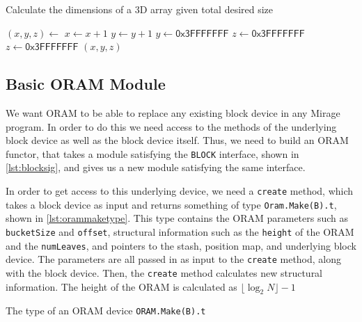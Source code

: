 \documentclass[12pt,a4paper,twoside,openright]{report}
\begin{document}
\begin{algorithm}
\caption{Calculate the dimensions of a 3D array given total desired size}
\label{alg:posmapdims}
\begin{algorithmic}[1]
\vskip 10pt
\vskip 10pt
\vskip 10pt
	\State $(x, y, z) \gets$ 
\vskip 10pt
	\State $x \gets x + 1$
	\State $y \gets y + 1$
\vskip 10pt
		\State $y \gets \mathsf{0x3FFFFFFF}$
		\State $z \gets \mathsf{0x3FFFFFFF}$
		\State $z \gets \mathsf{0x3FFFFFFF}$
	\EndIf
\vskip 10pt
	\State \Return $(x,y,z)$
\vskip 10pt
\EndFunction
\vskip 10pt
\end{algorithmic}
\end{algorithm}

\subsection{Basic ORAM Module}

We want ORAM to be able to replace any existing block device in any Mirage program. In order to do this we need access to the methods of the underlying block device as well as the block device itself. Thus, we need to build an ORAM functor, that takes a module satisfying the \texttt{BLOCK} interface, shown in \cref{lst:blocksig}, and gives us a new module satisfying the same interface.

In order to get access to this underlying device, we need a \texttt{create} method, which takes a block device as input and returns something of type \texttt{Oram.Make(B).t}, shown in \cref{lst:orammaketype}. This type contains the ORAM parameters such as \texttt{bucketSize} and \texttt{offset}, structural information such as the \texttt{height} of the ORAM and the \texttt{numLeaves}, and pointers to the stash, position map, and underlying block device. The parameters are all passed in as input to the \texttt{create} method, along with the block device. Then, the \texttt{create} method calculates new structural information. The height of the ORAM is calculated as $\lfloor \log_2N\rfloor - 1$

\begin{listing}[h]
\caption{The type of an ORAM device \texttt{ORAM.Make(B).t}}
\label{lst:orammaketype}
\inputminted[firstline=27, lastline=38]{ocaml}{../src/oram.ml}
\end{listing}
\end{document}
